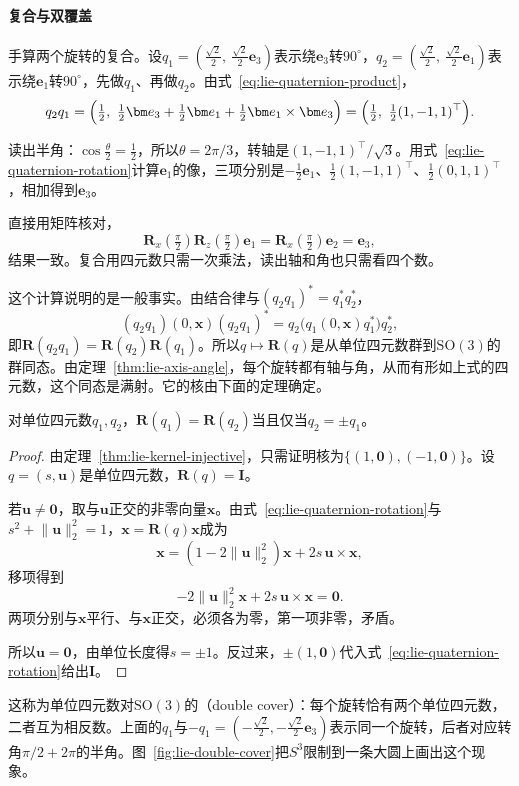 \paragraph{复合与双覆盖}
手算两个旋转的复合。设$q_1=(\frac{\sqrt2}2,\ \frac{\sqrt2}2\bm e_3)$表示绕$\bm e_3$转$90^\circ$，$q_2=(\frac{\sqrt2}2,\ \frac{\sqrt2}2\bm e_1)$表示绕$\bm e_1$转$90^\circ$，先做$q_1$、再做$q_2$。由式~\eqref{eq:lie-quaternion-product}，
\[
q_2q_1=\Bigl(\tfrac12,\ \tfrac12\bm e_3+\tfrac12\bm e_1+\tfrac12\bm e_1\times\bm e_3\Bigr)
=\Bigl(\tfrac12,\ \tfrac12(1,-1,1)^\top\Bigr).
\]

读出半角：$\cos\frac\theta2=\frac12$，所以$\theta=2\pi/3$，转轴是$(1,-1,1)^\top/\sqrt3$。用式~\eqref{eq:lie-quaternion-rotation}计算$\bm e_1$的像，三项分别是$-\frac12\bm e_1$、$\frac12(1,-1,1)^\top$、$\frac12(0,1,1)^\top$，相加得到$\bm e_3$。

直接用矩阵核对，
\[
\bm R_x(\tfrac\pi2)\bm R_z(\tfrac\pi2)\bm e_1=\bm R_x(\tfrac\pi2)\bm e_2=\bm e_3 ,
\]
结果一致。复合用四元数只需一次乘法，读出轴和角也只需看四个数。

这个计算说明的是一般事实。由结合律与$(q_2q_1)^*=q_1^*q_2^*$，
\[
(q_2q_1)(0,\bm x)(q_2q_1)^*=q_2\bigl(q_1(0,\bm x)q_1^*\bigr)q_2^* ,
\]
即$\bm R(q_2q_1)=\bm R(q_2)\bm R(q_1)$。所以$q\mapsto\bm R(q)$是从单位四元数群到$\mathrm{SO}(3)$的群同态。由定理~\ref{thm:lie-axis-angle}，每个旋转都有轴与角，从而有形如上式的四元数，这个同态是满射。它的核由下面的定理确定。

\begin{theorem}[单位四元数的双覆盖]
\label{thm:lie-double-cover}
对单位四元数$q_1,q_2$，$\bm R(q_1)=\bm R(q_2)$当且仅当$q_2=\pm q_1$。
\end{theorem}

\begin{proof}
由定理~\ref{thm:lie-kernel-injective}，只需证明核为$\{(1,\bm0),(-1,\bm0)\}$。设$q=(s,\bm u)$是单位四元数，$\bm R(q)=\bm I$。

若$\bm u\neq\bm0$，取与$\bm u$正交的非零向量$\bm x$。由式~\eqref{eq:lie-quaternion-rotation}与$s^2+\lVert\bm u\rVert_2^2=1$，$\bm x=\bm R(q)\bm x$成为
\[
\bm x=(1-2\lVert\bm u\rVert_2^2)\bm x+2s\,\bm u\times\bm x,
\]
移项得到
\[
-2\lVert\bm u\rVert_2^2\bm x+2s\,\bm u\times\bm x=\bm0 .
\]
两项分别与$\bm x$平行、与$\bm x$正交，必须各为零，第一项非零，矛盾。

所以$\bm u=\bm0$，由单位长度得$s=\pm1$。反过来，$\pm(1,\bm0)$代入式~\eqref{eq:lie-quaternion-rotation}给出$\bm I$。
\end{proof}

这称为单位四元数对$\mathrm{SO}(3)$的（double cover）：每个旋转恰有两个单位四元数，二者互为相反数。上面的$q_1$与$-q_1=(-\frac{\sqrt2}2,-\frac{\sqrt2}2\bm e_3)$表示同一个旋转，后者对应转角$\pi/2+2\pi$的半角。图~\ref{fig:lie-double-cover}把$S^3$限制到一条大圆上画出这个现象。

